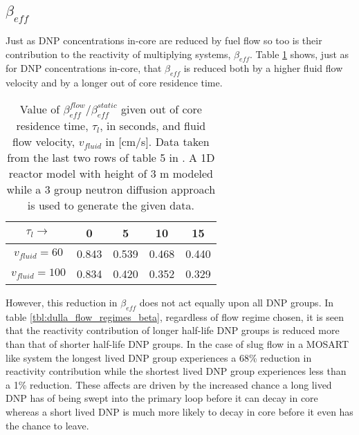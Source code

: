 \documentclass[review]{elsarticle}
\begin{document}
\subsection{$\beta_{eff}$} \label{ssec:beta}
Just as DNP concentrations in-core are reduced by fuel flow so too is their
contribution to the reactivity of multiplying systems, $\beta_{eff}$.
Table \ref{tbl:mattioda_beta_reduction} shows, just as for DNP concentrations
in-core, that $\beta_{eff}$ is reduced both by a higher fluid flow velocity and
by a longer out of core residence time.

\begin{table}[h]
    \caption{Value of $\beta_{eff}^{flow}/\beta_{eff}^{static}$ given out of
        core residence time, $\tau_{l}$, in seconds, 
        and fluid flow velocity, $v_{fluid}$ in [cm/s]. Data taken from
        the last two rows of table 5
        in \cite{mattioda_effective_2000}. A 1D reactor model with height of 3 m
        modeled while a 3 group neutron diffusion approach is used to generate
        the given data.} 
    \label{tbl:mattioda_beta_reduction}
    \begin{center}
        \begin{tabular}{|c|c|c|c|c|}
            \hline
            $\tau_{l}\rightarrow$ & 0 & 5 & 10 & 15 \\
            \hline
            $v_{fluid} = 60$ & 0.843 & 0.539 & 0.468 & 0.440 \\
            \hline
            $v_{fluid} = 100$ & 0.834 & 0.420 & 0.352 & 0.329 \\
            \hline
        \end{tabular}
    \end{center}
\end{table}

However,
this reduction in $\beta_{eff}$ does not act equally upon all DNP groups. In table
\ref{tbl:dulla_flow_regimes_beta}, regardless of flow regime chosen, it is seen
that the reactivity contribution of longer half-life DNP groups is
reduced more than that of shorter half-life DNP groups. In the case of slug
flow in a MOSART like system the longest lived DNP group experiences a 68\%
reduction in reactivity contribution while the shortest lived DNP group
experiences less than a 1\% reduction. These affects are driven by the increased
chance a long lived DNP has of being swept into the primary loop before it can
decay in core whereas a short lived DNP is much more likely to decay in core
before it even has the chance to leave.
\end{document}
